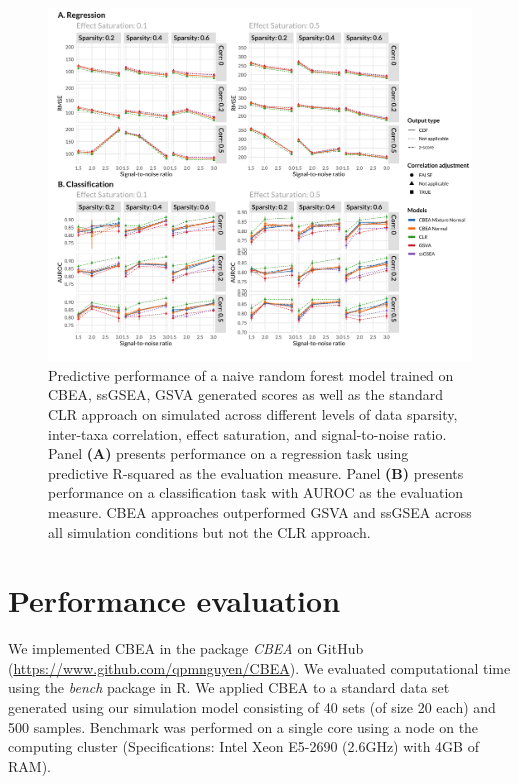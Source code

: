 \documentclass{article}
\begin{document}
\begin{figure}[!h]
    \centering
    \includegraphics[width = \linewidth]{figures/sim_pred_combined.png}
    \caption{Predictive performance of a naive random forest model trained on CBEA, ssGSEA, GSVA generated scores as well as the standard CLR approach on simulated across different levels of data sparsity, inter-taxa correlation, effect saturation, and signal-to-noise ratio. Panel \textbf{(A)} presents performance on a regression task using predictive R-squared as the evaluation measure. Panel \textbf{(B)} presents performance on a classification task with AUROC as the evaluation measure. CBEA approaches outperformed GSVA and ssGSEA across all simulation conditions but not the CLR approach.}
    \label{fig:s5}
\end{figure}


\section{Performance evaluation} 
We implemented CBEA in the package \emph{CBEA} on GitHub (\url{https://www.github.com/qpmnguyen/CBEA}). We evaluated computational time using the \emph{bench} package in R. We applied CBEA to a standard data set generated using our simulation model consisting of 40 sets (of size 20 each) and 500 samples. Benchmark was performed on a single core using a node on the computing cluster (Specifications: Intel Xeon E5-2690 (2.6GHz) with 4GB of RAM). 
\end{document}
